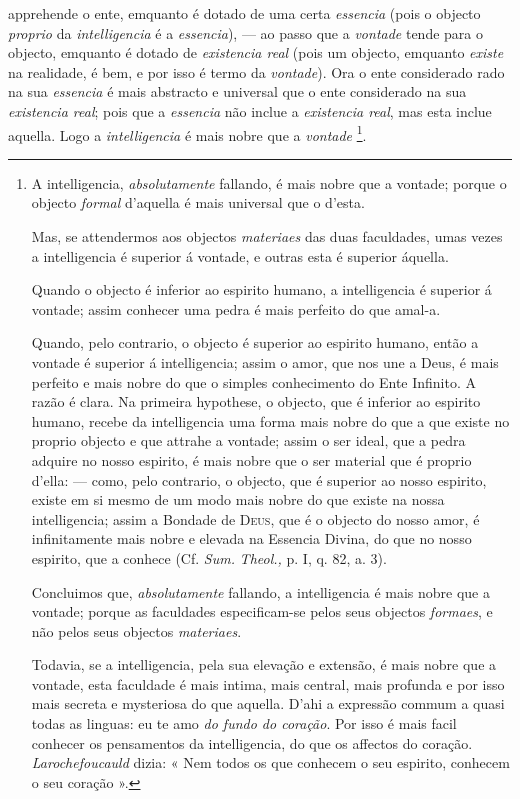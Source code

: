 apprehende o ente, emquanto é dotado de uma certa \emph{essencia}   (pois o objecto \emph{proprio} da \emph{intelligencia} é a \emph{essencia}), --- ao passo que a \emph{vontade} tende para o objecto, emquanto é dotado de \emph{existencia real} (pois um objecto, emquanto \emph{existe} na realidade, é bem, e por isso é termo da \emph{vontade}). Ora o ente considerado  rado na sua \emph{essencia} é mais abstracto e universal que o ente considerado na sua \emph{existencia real}; pois que a \emph{essencia} não inclue a \emph{existencia real}, mas esta inclue aquella. Logo a \emph{intelligencia} é mais nobre que a \emph{vontade} \footnote{A intelligencia, \emph{absolutamente} fallando, é mais nobre que a vontade; porque o objecto \emph{formal} d'aquella é mais universal que o d'esta.\par Mas, se attendermos aos objectos \emph{materiaes} das duas faculdades, umas vezes a intelligencia é superior á vontade, e outras esta é superior áquella.\par Quando o objecto é inferior ao espirito humano, a intelligencia é superior á vontade; assim conhecer uma pedra é mais perfeito do que amal-a.\par Quando, pelo contrario, o objecto é superior ao espirito humano, então a vontade é superior á intelligencia; assim o amor, que nos une a Deus, é mais perfeito e mais nobre do que o simples conhecimento do Ente Infinito. A razão é clara. Na primeira hypothese, o objecto, que é inferior ao espirito humano, recebe da intelligencia uma forma mais nobre do que a que existe no proprio objecto e que attrahe a vontade; assim o ser ideal, que a pedra adquire no nosso espirito, é mais nobre que o ser material que é proprio d'ella: --- como, pelo contrario, o objecto, que é superior ao nosso espirito, existe em si mesmo de um modo mais nobre do que existe na nossa intelligencia; assim a Bondade de \textsc{Deus}, que é o objecto do nosso amor, é infinitamente mais nobre e elevada na Essencia Divina, do que no nosso espirito, que a conhece (Cf. \emph{Sum.} \emph{Theol.,} p. I, q. 82, a. 3).\par Concluimos que, \emph{absolutamente} fallando, a intelligencia é mais nobre que a vontade; porque as faculdades especificam-se pelos seus objectos \emph{formaes}, e não pelos seus objectos \emph{materiaes}.\par Todavia, se a intelligencia, pela sua elevação e extensão, é mais nobre que a vontade, esta faculdade é mais intima, mais central, mais profunda e por isso mais secreta e mysteriosa do que aquella. D'ahi a expressão commum a quasi todas as linguas: eu te amo \emph{do fundo do coração}. Por isso é mais facil conhecer os pensamentos da intelligencia, do que os affectos do coração. \emph{Larochefoucauld} dizia: « Nem todos os que conhecem o seu espirito, conhecem o seu coração ».}.
